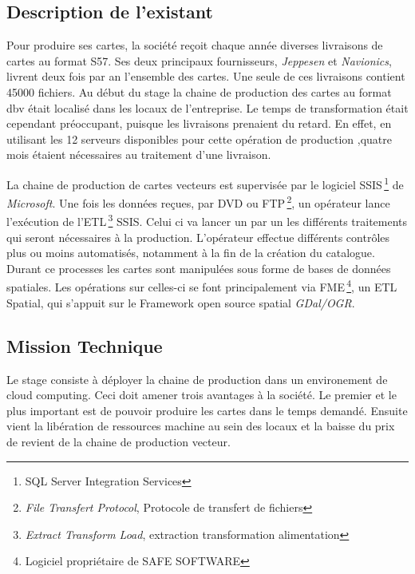 



\subsection{Description de l'existant}
Pour produire ses cartes, la société \maxsea reçoit chaque année
diverses livraisons de cartes au format S57. Ses deux principaux
fournisseurs, \textit{Jeppesen} et \textit{Navionics}, livrent deux
fois par an l'ensemble des cartes. Une seule de ces livraisons
contient 45000 fichiers. Au début du stage la chaine de production des
cartes au format dbv était localisé dans les locaux de
l'entreprise. Le temps de transformation était cependant préoccupant,
puisque les livraisons prenaient du retard. En effet, en utilisant les
12 serveurs disponibles pour cette opération de production ,quatre
mois étaient nécessaires au traitement d'une livraison.

La chaine de production de cartes vecteurs est supervisée par le
logiciel SSIS\,\footnote{SQL Server Integration Services} de
\textit{Microsoft}. Une fois les données reçues, par DVD ou
FTP\,\footnote{\textit{File Transfert Protocol}, Protocole de
  transfert de fichiers}, un opérateur lance l'exécution de
l'ETL\,\footnote{\textit{Extract Transform Load}, extraction
  transformation alimentation} SSIS. Celui ci va lancer un par un les
différents traitements qui seront nécessaires à la
production. L'opérateur effectue différents contrôles plus ou moins
automatisés, notamment à la fin de la création du catalogue. Durant ce
processes les cartes sont manipulées sous forme de bases de données
spatiales. Les opérations sur celles-ci se font principalement via
FME\,\footnote{Logiciel propriétaire de SAFE SOFTWARE}, un ETL
Spatial, qui s'appuit sur le Framework open source spatial
\textit{GDal/OGR}.

\subsection{Mission Technique}
Le stage consiste à déployer la chaine de production dans un
environement de cloud computing. Ceci doit amener trois avantages à la
société. Le premier et le plus important est de pouvoir produire les
cartes dans le temps demandé. Ensuite vient la libération de
ressources machine au sein des locaux et la baisse du prix de revient
de la chaine de production vecteur.

